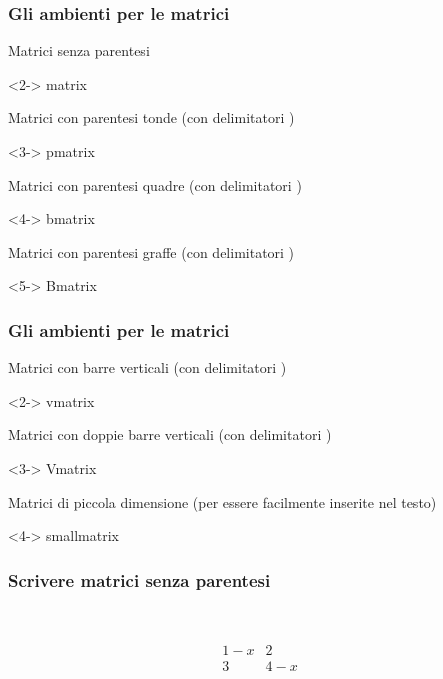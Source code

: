 \documentclass[svgnames,%
	ucs,%
	pdftex]{guitbeamer}
\begin{document}
\begin{frame}
  \frametitle{Gli ambienti per le matrici}
	Matrici	senza parentesi
	\begin{LaTeXcode}<2->
		matrix
	\end{LaTeXcode}
	Matrici con parentesi tonde (con delimitatori \LCmd[]{(}\;\LCmd[]{)})
	\begin{LaTeXcode}<3->
		pmatrix
	\end{LaTeXcode}
	Matrici con parentesi quadre (con delimitatori \LCmd[]{\ls\;\rs})
	\begin{LaTeXcode}<4->
		bmatrix
	\end{LaTeXcode}
	Matrici con parentesi graffe (con delimitatori \LCmd[]{\tlb}\;\LCmd[]{\trb})
	\begin{LaTeXcode}<5->
		Bmatrix
	\end{LaTeXcode}
\end{frame}
\begin{frame}
  \frametitle{Gli ambienti per le matrici}
	Matrici con barre verticali (con delimitatori \LCmd[]{|}\;\LCmd[]{|})
	\begin{LaTeXcode}<2->
		vmatrix
	\end{LaTeXcode}
	Matrici con doppie barre verticali (con delimitatori \LCmd[]{||}\;\LCmd[]{||})
	\begin{LaTeXcode}<3->
		Vmatrix
	\end{LaTeXcode}
	Matrici di piccola dimensione (per essere facilmente inserite nel testo)
	\begin{LaTeXcode}<4->
		smallmatrix
	\end{LaTeXcode}
\end{frame}
\begin{frame}
  \frametitle{Scrivere matrici senza parentesi}
	\begin{LaTeXcode}
		\\[\n
		\alert{\\begin\{matrix\}}\n
		\hspace*{5ex} 1-x \& 2 \bs\bs\n
		\hspace*{5ex} 3   \& 4-x \n
		\alert{\\end\{matrix\}}\n
		\\]
	\end{LaTeXcode}
	\begin{LaTeXoutput}
		\[
		\begin{matrix}
		1-x & 2 \\
		3 & 4-x
		\end{matrix}
		\]
	\end{LaTeXoutput}
\end{frame}
\end{document}

